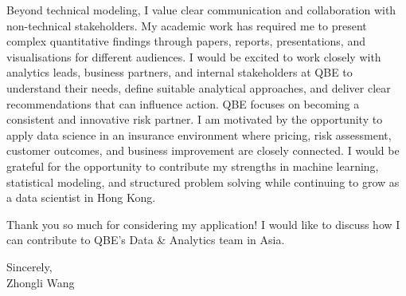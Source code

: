 \documentclass[11pt]{article}
\begin{document}
Beyond technical modeling, I value clear communication and collaboration with non-technical stakeholders. My academic work has required me to present complex quantitative findings through papers, reports, presentations, and visualisations for different audiences. I would be excited to work closely with analytics leads, business partners, and internal stakeholders at QBE to understand their needs, define suitable analytical approaches, and deliver clear recommendations that can influence action. QBE focuses on becoming a consistent and innovative risk partner. I am motivated by the opportunity to apply data science in an insurance environment where pricing, risk assessment, customer outcomes, and business improvement are closely connected. I would be grateful for the opportunity to contribute my strengths in machine learning, statistical modeling, and structured problem solving while continuing to grow as a data scientist in Hong Kong.

Thank you so much for considering my application! I would like to discuss how I can contribute to QBE's Data \& Analytics team in Asia.

\vspace{0.15cm}

\noindent Sincerely, \\[0.1cm]
\noindent Zhongli Wang
\end{document}

